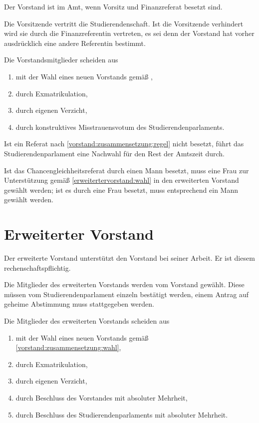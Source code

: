 Der Vorstand ist im Amt, wenn Vorsitz und Finanzreferat besetzt sind.

Die Vorsitzende vertritt die Studierendenschaft. Ist die Vorsitzende  verhindert wird sie durch die Finanzreferentin vertreten, es sei denn der Vorstand hat vorher ausdrücklich eine andere Referentin bestimmt.

Die Vorstandsmitglieder scheiden aus
  \begin{enumerate}
  \item mit der Wahl eines neuen Vorstands gemäß ,
  \item durch Exmatrikulation,
  \item durch eigenen Verzicht,
  \item durch konstruktives Misstrauensvotum des Studierendenparlaments.
  \end{enumerate}
    Ist ein Referat nach \ref{vorstand:zusammensetzung:regel} nicht besetzt, führt das Studierendenparlament eine Nachwahl für den Rest der Amtszeit durch.

Ist das Chancengleichheitsreferat durch einen Mann besetzt, muss eine Frau zur Unterstützung gemäß \ref{erweitertervorstand:wahl} in den erweiterten Vorstand gewählt werden; ist es durch eine Frau besetzt, muss entsprechend ein Mann gewählt werden.


%
%

\parnumberfalse \section{Erweiterter Vorstand} \parnumbertrue

\label{erweitertervorstand:aufgaben}
\parnumberfalse Der erweiterte Vorstand unterstützt den Vorstand bei seiner Arbeit. Er ist diesem rechenschaftspflichtig.\parnumbertrue

 \label{erweitertervorstand:wahl}

Die Mitglieder des erweiterten Vorstands werden vom Vorstand gewählt. Diese müssen vom Studierendenparlament einzeln bestätigt werden, einem Antrag auf geheime Abstimmung muss stattgegeben werden.

Die Mitglieder des erweiterten Vorstands scheiden aus
\begin{enumerate}
  \item mit der Wahl eines neuen Vorstands gemäß \ref{vorstand:zusammensetzung:wahl},
  \item durch Exmatrikulation,
  \item durch eigenen Verzicht,
  \item durch Beschluss des Vorstandes mit absoluter Mehrheit,
  \item durch Beschluss des Studierendenparlaments mit absoluter Mehrheit.
\end{enumerate}



